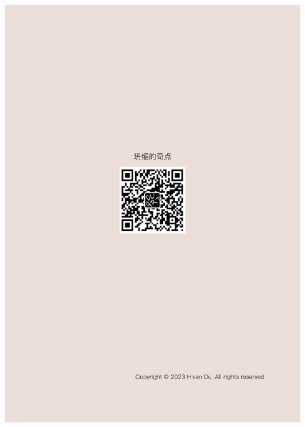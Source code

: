 \documentclass[oneside]{book}
\begin{document}
\clearpage
\begin{titlepage}
  \centering
  \includegraphics[width=\textwidth,height=\textheight, keepaspectratio]{Ebook_backcover.png}
\end{titlepage}
\end{document}
